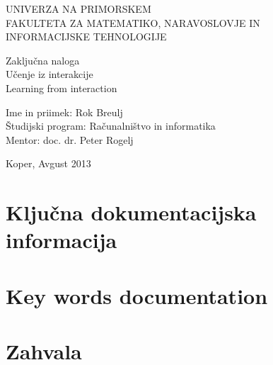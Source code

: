 \documentclass[a4paper, oneside, 12pt]{article}
\begin{document}
\begin{titlepage}
\begin{center}
\begin{large}
UNIVERZA NA PRIMORSKEM\\
FAKULTETA ZA MATEMATIKO, NARAVOSLOVJE IN\\
INFORMACIJSKE TEHNOLOGIJE\\[6cm]
\end{large}
\end{center}

\begin{center}
Zaključna naloga\\
{\large Učenje iz interakcije}\\
Learning from interaction\\[6cm]
\end{center}

\noindent
Ime in priimek: Rok Breulj\\
Študijski program: Računalništvo in informatika\\
Mentor: doc. dr. Peter Rogelj\\

\vfill
\begin{center}
{\large Koper, Avgust 2013}
\end{center}
\end{titlepage}

\section*{Ključna dokumentacijska informacija}
\newpage

\section*{Key words documentation}
\newpage

\section*{Zahvala}
\newpage

\tableofcontents
\newpage

\listoftables
\newpage
\end{document}
